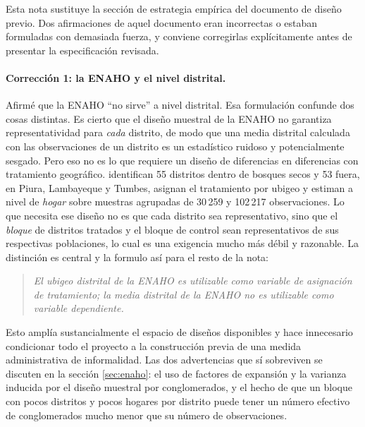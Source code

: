 \documentclass[11pt,a4paper]{article}
\begin{document}
Esta nota sustituye la sección de estrategia empírica del documento de diseño previo. Dos afirmaciones de aquel documento eran incorrectas o estaban formuladas con demasiada fuerza, y conviene corregirlas explícitamente antes de presentar la especificación revisada.

\paragraph{Corrección 1: la ENAHO y el nivel distrital.} Afirmé que la ENAHO ``no sirve'' a nivel distrital. Esa formulación confunde dos cosas distintas. Es cierto que el diseño muestral de la ENAHO no garantiza representatividad para \emph{cada} distrito, de modo que una media distrital calculada con las observaciones de un distrito es un estadístico ruidoso y potencialmente sesgado. Pero eso no es lo que requiere un diseño de diferencias en diferencias con tratamiento geográfico. \citet{pecastaing2020} identifican 55 distritos dentro de bosques secos y 53 fuera, en Piura, Lambayeque y Tumbes, asignan el tratamiento por ubigeo y estiman a nivel de \emph{hogar} sobre muestras agrupadas de 30\,259 y 102\,217 observaciones. Lo que necesita ese diseño no es que cada distrito sea representativo, sino que el \emph{bloque} de distritos tratados y el bloque de control sean representativos de sus respectivas poblaciones, lo cual es una exigencia mucho más débil y razonable. La distinción es central y la formulo así para el resto de la nota:

\begin{quote}
\emph{El ubigeo distrital de la ENAHO es utilizable como variable de asignación de tratamiento; la media distrital de la ENAHO no es utilizable como variable dependiente.}
\end{quote}

Esto amplía sustancialmente el espacio de diseños disponibles y hace innecesario condicionar todo el proyecto a la construcción previa de una medida administrativa de informalidad. Las dos advertencias que sí sobreviven se discuten en la sección \ref{sec:enaho}: el uso de factores de expansión y la varianza inducida por el diseño muestral por conglomerados, y el hecho de que un bloque con pocos distritos y pocos hogares por distrito puede tener un número efectivo de conglomerados mucho menor que su número de observaciones.
\end{document}
